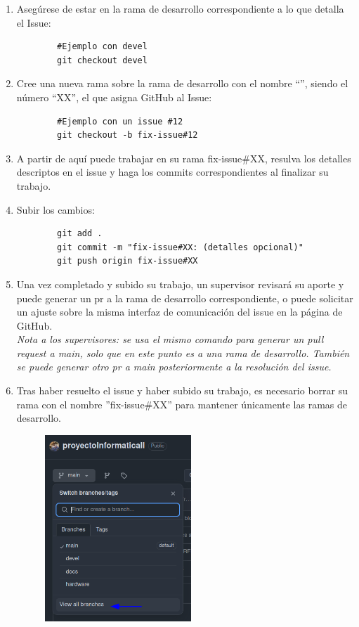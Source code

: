 \documentclass[a4paper]{article}
\begin{document}
\begin{enumerate}
    \item Asegúrese de estar en la rama de desarrollo correspondiente a lo que detalla el Issue:
    \begin{lstlisting}
        #Ejemplo con devel
        git checkout devel
    \end{lstlisting}

\newpage
\noindent
\thispagestyle{fancy}

\item Cree una nueva rama sobre la rama de desarrollo con el nombre ``'', siendo el número ``XX'', el que asigna GitHub al Issue:

    \begin{lstlisting}
        #Ejemplo con un issue #12
        git checkout -b fix-issue#12
    \end{lstlisting}

\item A partir de aquí puede trabajar en su rama fix-issue\#XX, resulva los detalles descriptos en el issue y haga los commits correspondientes al finalizar su trabajo. \\

\item Subir los cambios: 

    \begin{lstlisting}
        git add .
        git commit -m "fix-issue#XX: (detalles opcional)"
        git push origin fix-issue#XX
    \end{lstlisting}

\item Una vez completado y subido su trabajo, un supervisor revisará su aporte y puede generar un pr a la rama de desarrollo correspondiente, o puede solicitar un ajuste sobre la misma interfaz de comunicación del issue en la página de GitHub.\\

    \textit{Nota a los supervisores: se usa el mismo comando para generar un pull request a main, solo que en este punto es a una rama de desarrollo. También se puede generar otro pr a main posteriormente a la resolución del issue.}

\item Tras haber resuelto el issue y haber subido su trabajo, es necesario borrar su rama con el nombre ''fix-issue\#XX'' para mantener únicamente las ramas de desarrollo. \\

    \begin{figure}[h!]
        \centering
        \includegraphics[width=5.5cm]{../imagenesParaInformes/ramasDelProyecto.png}
    \end{figure}

\end{enumerate}
\end{document}
